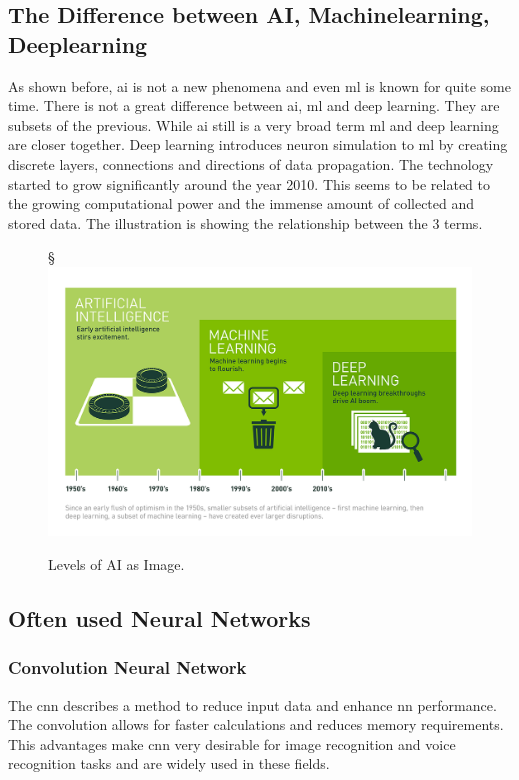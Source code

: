 \documentclass[10pt,a4paper]{article}
\begin{document}
\subsection{The Difference between AI, Machinelearning, Deeplearning}
\label{sec:AIMachinelearningDeeplearning}
As shown before, \gls{ai} is not a new phenomena and even \gls{ml} is known for quite some time. There is not a great difference between \gls{ai}, \gls{ml} and deep learning. They are subsets of the previous. While \gls{ai} still is a very broad term \gls{ml} and deep learning are closer together. Deep learning introduces neuron simulation to \gls{ml} by creating discrete layers, connections and directions of data propagation\cite{MichaelCopeland2016}. The technology started to grow significantly around the year 2010. This seems to be related to the growing computational power and the immense amount of collected and stored data\cite{MichaelCopeland2016}. The illustration is showing the relationship between the 3 terms.
\begin{figure}[H]§
	\includegraphics[width=\textwidth, height=\textheight, keepaspectratio]{Deep_Learning_Icons_R5.png}
	\caption{Levels of AI as Image\cite{MichaelCopeland2016}.}
\end{figure}

\subsection{Often used Neural Networks}
\subsubsection{Convolution Neural Network}
The \gls{cnn} describes a method to reduce input data and enhance \gls{nn} performance. The convolution allows for faster calculations and reduces memory requirements. This advantages make \gls{cnn} very desirable for image recognition and voice recognition tasks and are widely used in these fields.
\end{document}
